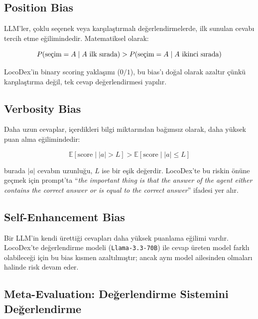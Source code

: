 \subsection{Position Bias}

LLM'ler, \c{c}oklu se\c{c}enek veya kar\c{s}{\i}la\c{s}t{\i}rmal{\i} de\u{g}erlendirmelerde, ilk sunulan cevab{\i} tercih etme e\u{g}ilimindedir. Matematiksel olarak:

\begin{equation}
P(\text{se\c{c}im} = A \mid A \text{ ilk s{\i}rada}) > P(\text{se\c{c}im} = A \mid A \text{ ikinci s{\i}rada})
\end{equation}

LocoDex'in binary scoring yakla\c{s}{\i}m{\i} ($0/1$), bu bias'{\i} do\u{g}al olarak azalt{\i}r \c{c}\"{u}nk\"{u} kar\c{s}{\i}la\c{s}t{\i}rma de\u{g}il, tek cevap de\u{g}erlendirmesi yap{\i}l{\i}r.

\subsection{Verbosity Bias}

Daha uzun cevaplar, i\c{c}erdikleri bilgi miktar{\i}ndan ba\u{g}{\i}ms{\i}z olarak, daha y\"{u}ksek puan alma e\u{g}ilimindedir:

\begin{equation}
\mathbb{E}[\text{score} \mid |a| > L] > \mathbb{E}[\text{score} \mid |a| \leq L]
\end{equation}

\noindent burada $|a|$ cevab{\i}n uzunlu\u{g}u, $L$ ise bir e\c{s}ik de\u{g}erdir. LocoDex'te bu riskin \"{o}n\"{u}ne ge\c{c}mek i\c{c}in prompt'ta ``\emph{the important thing is that the answer of the agent either contains the correct answer or is equal to the correct answer}'' ifadesi yer al{\i}r.

\subsection{Self-Enhancement Bias}

Bir LLM'in kendi \"{u}retti\u{g}i cevaplar{\i} daha y\"{u}ksek puanlama e\u{g}ilimi vard{\i}r. LocoDex'te de\u{g}erlendirme modeli (\texttt{Llama-3.3-70B}) ile cevap \"{u}reten model farkl{\i} olabilece\u{g}i i\c{c}in bu bias k{\i}smen azalt{\i}lm{\i}\c{s}t{\i}r; ancak ayn{\i} model ailesinden olmalar{\i} halinde risk devam eder.

\subsection{Meta-Evaluation: De\u{g}erlendirme Sistemini De\u{g}erlendirme}

